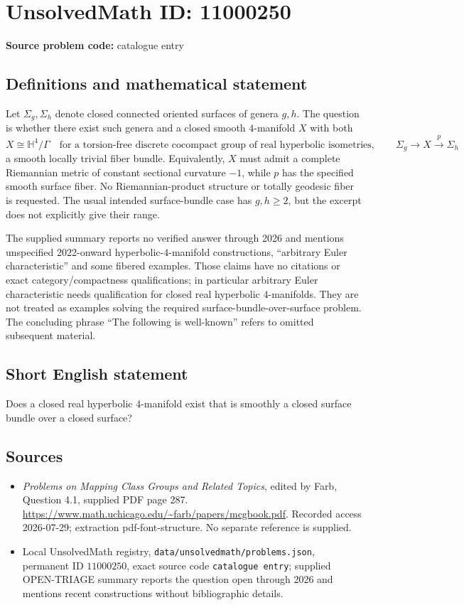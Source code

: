 \documentclass[11pt]{article}
\begin{document}
\section*{UnsolvedMath ID: 11000250}
\textbf{Source problem code:} catalogue entry
\subsection{Definitions and mathematical statement}
Let \(\Sigma_g,\Sigma_h\) denote closed connected oriented surfaces of genera \(g,h\). The question is whether there exist such genera and a closed smooth \(4\)-manifold \(X\) with both
\[
 X\cong\mathbb H^4/\Gamma
 \quad\text{for a torsion-free discrete cocompact group of real hyperbolic isometries},
 \qquad
 \Sigma_g\longrightarrow X\xrightarrow{p}\Sigma_h
\]
a smooth locally trivial fiber bundle. Equivalently, \(X\) must admit a complete Riemannian metric of constant sectional curvature \(-1\), while \(p\) has the specified smooth surface fiber. No Riemannian-product structure or totally geodesic fiber is requested. The usual intended surface-bundle case has \(g,h\geq2\), but the excerpt does not explicitly give their range.

The supplied summary reports no verified answer through 2026 and mentions unspecified 2022-onward hyperbolic-\(4\)-manifold constructions, ``arbitrary Euler characteristic'' and some fibered examples. Those claims have no citations or exact category/compactness qualifications; in particular arbitrary Euler characteristic needs qualification for closed real hyperbolic \(4\)-manifolds. They are not treated as examples solving the required surface-bundle-over-surface problem. The concluding phrase ``The following is well-known'' refers to omitted subsequent material.
\subsection{Short English statement}
Does a closed real hyperbolic \(4\)-manifold exist that is smoothly a closed surface bundle over a closed surface?
\subsection{Sources}
\begin{itemize}
\item \emph{Problems on Mapping Class Groups and Related Topics}, edited by Farb, Question 4.1, supplied PDF page 287. \url{https://www.math.uchicago.edu/~farb/papers/mcgbook.pdf}. Recorded access 2026-07-29; extraction pdf-font-structure. No separate reference is supplied.
\item Local UnsolvedMath registry, \texttt{data/unsolvedmath/problems.json}, permanent ID \(11000250\), exact source code \texttt{catalogue entry}; supplied OPEN-TRIAGE summary reports the question open through 2026 and mentions recent constructions without bibliographic details.
\end{itemize}
\end{document}
